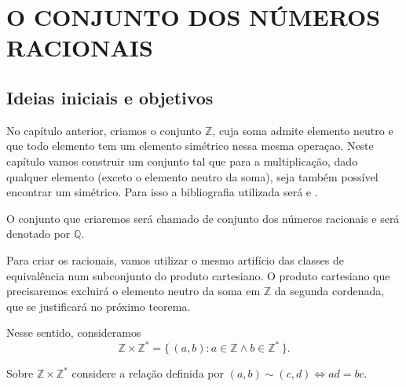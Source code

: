 \documentclass[../main.tex]{subfiles}
\begin{document}
\chapter{O CONJUNTO DOS NÚMEROS RACIONAIS}\label{cap-racionais}
\section{Ideias iniciais e objetivos}

No capítulo anterior, criamos o conjunto $\mathbb{Z}$, cuja soma admite elemento neutro e que todo elemento tem um elemento simétrico nessa mesma operaçao. Neste capítulo vamos construir um conjunto tal que para a multiplicação, dado qualquer elemento (exceto o elemento neutro da soma), seja também possível encontrar um simétrico. Para isso a bibliografia utilizada será \textcite{domingues-2009} e \textcite{ferreira}.

O conjunto que criaremos será chamado de conjunto dos números racionais e será denotado por $\mathbb{Q}$.

Para criar os racionais, vamos utilizar o mesmo artifício das classes de equivalência num subconjunto do produto cartesiano. O produto cartesiano que precisaremos excluirá o elemento neutro da soma em $\mathbb{Z}$ da segunda cordenada, que se justificará no próximo teorema.

Nesse sentido, consideramos 
 \[ \mathbb{Z} \times \mathbb{Z}^* = \{\, \left( a,b \right) : a \in \mathbb{Z} \land b \in \mathbb{Z}^* \,\}. \]

Sobre $\mathbb{Z} \times \mathbb{Z}^*$ considere a relação definida por $\left( a,b \right) \sim \left( c,d \right) \iff ad = bc$.
\end{document}
